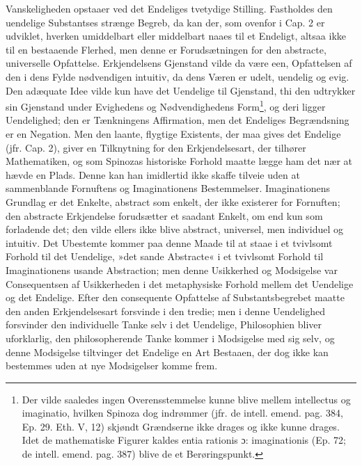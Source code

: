 \documentclass[12pt,a4paper]{book}
\newcommand{\opage}[1]{\marginnote{\footnotesize\textit{[#1]}}}
\begin{document}
Vanskeligheden opstaaer ved det Endeliges tvetydige Stilling.
Fastholdes den uendelige Substantses strænge Begreb, da kan der, som
ovenfor i Cap. 2 er udviklet, hverken umiddelbart eller middelbart
naaes til et Endeligt, altsaa ikke til en bestaaende Flerhed, men
denne er Forudsætningen for den abstracte, universelle Opfattelse.
Erkjendelsens Gjenstand vilde da være een, Opfattelsen af den i dens
\opage{104} \setcounter{footnote}{0}%
Fylde nødvendigen intuitiv, da dens Væren er udelt, uendelig og
evig. Den adæquate Idee vilde kun have det Uendelige til Gjenstand,
thi den udtrykker sin Gjenstand under Evighedens og Nødvendighedens
Form\footnote{Der vilde saaledes ingen Overensstemmelse kunne blive
mellem intellectus og imaginatio, hvilken Spinoza dog indrømmer
(jfr. de intell. emend. pag. 384, Ep. 29. Eth. V, 12) skjøndt
Grændserne ikke drages og ikke kunne drages. Idet de mathematiske
Figurer kaldes entia rationis ɔ: imaginationis (Ep. 72; de intell.
emend. pag. 387) blive de et Berøringspunkt.}, og deri ligger
Uendelighed; den er Tænkningens Affirmation, men det Endeliges
Begrændsning er en Negation. Men den laante, flygtige Existents, der
maa gives det Endelige (jfr. Cap. 2), giver en Tilknytning for den
Erkjendelsesart, der tilhører Mathematiken, og som Spinozas
historiske Forhold maatte lægge ham det nær at hævde en Plads.
Denne kan han imidlertid ikke skaffe tilveie uden at sammenblande
Fornuftens og Imaginationens Bestemmelser. Imaginationens Grundlag
er det Enkelte, abstract som enkelt, der ikke existerer for
Fornuften; den abstracte Erkjendelse forudsætter et saadant Enkelt,
om end kun som forladende det; den vilde ellers ikke blive abstract,
universel, men individuel og intuitiv. Det Ubestemte kommer paa
denne Maade til at staae i et tvivlsomt Forhold til det Uendelige,
»det sande Abstracte« i et tvivlsomt Forhold til Imaginationens
usande Abstraction; men denne Usikkerhed og Modsigelse var
Consequentsen af Usikkerheden i det metaphysiske Forhold mellem det
Uendelige og det Endelige. Efter den consequente Opfattelse af
Substantsbegrebet maatte den anden Erkjendelsesart forsvinde i den
tredie; men i denne Uendelighed forsvinder den individuelle Tanke
selv i det Uendelige, Philosophien bliver uforklarlig, den
philosopherende Tanke kommer i Modsigelse med sig selv, og denne
Modsigelse tiltvinger det Endelige en Art Bestaaen, der dog ikke kan
bestemmes uden at nye Modsigelser komme frem.
\end{document}

